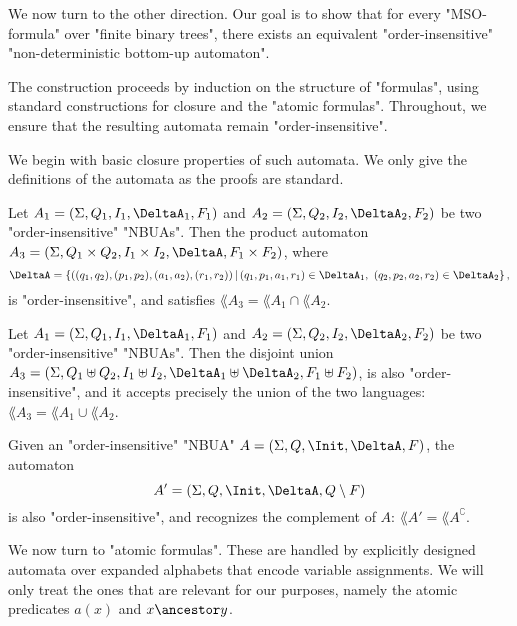 \documentclass[a4paper,UKenglish,cleveref, autoref, thm-restate]{lipics-v2021}
\begin{document}
We now turn to the other direction. Our goal is to show that for every "MSO-formula" over "finite binary trees",
there exists an equivalent "order-insensitive" "non-deterministic bottom-up automaton".

The construction proceeds by induction on the structure of "formulas", using standard constructions for closure and the "atomic formulas".
Throughout, we ensure that the resulting automata remain "order-insensitive".

We begin with basic closure properties of such automata. We only give the definitions of the automata as the proofs are standard.

\begin{lemma}[intersection]\label{lem:intersection}
	Let $A_1 = (\Sigma, Q_1, I_1, \DeltaA_1, F_1)$ and $A_2 = (\Sigma, Q_2, I_2, \DeltaA_2, F_2)$ be two "order-insensitive" "NBUAs". Then the product automaton
	$A_3 = (\Sigma, Q_1 \times Q_2, I_1 \times I_2, \DeltaA, F_1 \times F_2)$, where
	\[
		\DeltaA = \left\{ ((q_1,q_2), (p_1,p_2), (a_1,a_2), (r_1,r_2)) \,\middle|\, (q_1,p_1,a_1,r_1) \in \DeltaA_1,\ (q_2,p_2,a_2,r_2) \in \DeltaA_2 \right\},
	\]
	is "order-insensitive", and satisfies $\lang{A_3} = \lang{A_1} \cap \lang{A_2}$.
\end{lemma}

\begin{lemma}[union]\label{lem:union}
	Let $A_1 = (\Sigma, Q_1, I_1, \DeltaA_1, F_1)$ and $A_2 = (\Sigma, Q_2, I_2, \DeltaA_2, F_2)$ be two "order-insensitive" "NBUAs". Then the disjoint union
	$A_3 = (\Sigma, Q_1 \uplus Q_2, I_1 \uplus I_2, \DeltaA_1 \uplus \DeltaA_2, F_1 \uplus F_2)$,
	is also "order-insensitive", and it accepts precisely the union of the two languages: $\lang{A_3} = \lang{A_1} \cup \lang{A_2}$.
\end{lemma}

\begin{lemma}[complement]\label{lem:complement}
	Given an "order-insensitive" "NBUA" $A = (\Sigma, Q, \Init, \DeltaA, F)$, the automaton
	\[
		A' = (\Sigma, Q, \Init, \DeltaA, Q \setminus F)
	\]
	is also "order-insensitive", and recognizes the complement of $A$: $\lang{A'} = \lang{A}^\complement$.
\end{lemma}

We now turn to "atomic formulas". These are handled by explicitly designed automata over expanded alphabets that encode variable assignments.
We will only treat the ones that are relevant for our purposes, namely the atomic predicates $a(x)$ and $x \ancestor y$.
\end{document}
